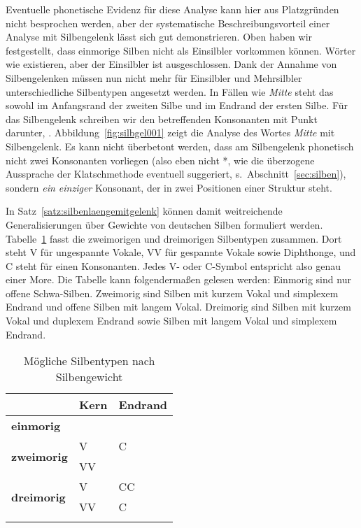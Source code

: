Eventuelle phonetische Evidenz für diese Analyse kann hier aus Platzgründen nicht besprochen werden, aber der systematische Beschreibungsvorteil einer Analyse mit Silbengelenk lässt sich gut demonstrieren.
Oben haben wir festgestellt, dass einmorige Silben nicht als Einsilbler vorkommen können.
Wörter wie \textipa{[mI.t@]} existieren, aber der Einsilbler \textipa{[mI]} ist ausgeschlossen.
Dank der Annahme von Silbengelenken müssen nun nicht mehr für Einsilbler und Mehrsilbler unterschiedliche Silbentypen angesetzt werden.
In Fällen wie \textit{Mitte} steht das \textipa{[t]} sowohl im Anfangsrand der zweiten Silbe und im Endrand der ersten Silbe.
Für das Silbengelenk schreiben wir den betreffenden Konsonanten mit Punkt darunter, \zB \textipa{[mI\Sgel{t}@]}.
Abbildung~\ref{fig:silbgel001} zeigt die Analyse des Wortes \textit{Mitte} mit Silbengelenk.
Es kann nicht überbetont werden, dass am Silbengelenk phonetisch nicht zwei Konsonanten vorliegen (also eben nicht *\textipa{[mIt.t@]}, wie die überzogene Aussprache der Klatschmethode eventuell suggeriert, s.\ Abschnitt~\ref{sec:silben}), sondern \textit{ein einziger} Konsonant, der in zwei Positionen einer Struktur steht.

In Satz~\ref{satz:silbenlaengemitgelenk} können damit weitreichende Generalisierungen über Gewichte von deutschen Silben formuliert werden.
Tabelle~\ref{tab:morentypen} fasst die zweimorigen und dreimorigen Silbentypen zusammen.
Dort steht V für ungespannte Vokale, VV für gespannte Vokale sowie Diphthonge, und C steht für einen Konsonanten.
Jedes V- oder C-Symbol entspricht also genau einer More.
Die Tabelle kann folgendermaßen gelesen werden:
Einmorig sind nur offene Schwa-Silben.
Zweimorig sind Silben mit kurzem Vokal und simplexem Endrand und offene Silben mit langem Vokal.
Dreimorig sind Silben mit kurzem Vokal und duplexem Endrand sowie Silben mit langem Vokal und simplexem Endrand.


\begin{table}
	\centering
	\begin{tabular}{lll}
		\lsptoprule
		 & \textbf{Kern} & \textbf{Endrand} \\
		\midrule
		\textbf{einmorig} & \textipa{@} & \\
		\midrule
		\multirow{2}{*}{\textbf{zweimorig}} & V & C \\
		& VV & \\
		\midrule
		\multirow{2}{*}{\textbf{dreimorig}} & V & CC \\
		& VV & C \\
		\lspbottomrule
	\end{tabular}
	\caption{Mögliche Silbentypen nach Silbengewicht}	
	\label{tab:morentypen}
\end{table}

